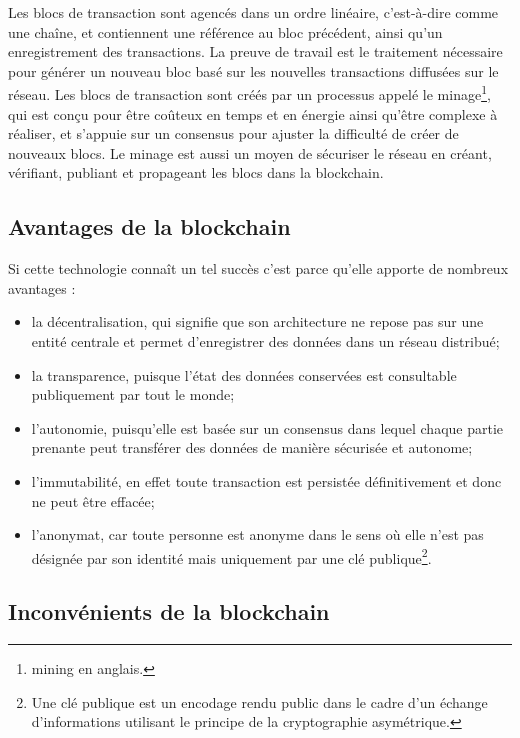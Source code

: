 \documentclass{tnreport}
\begin{document}
Les blocs de transaction sont agencés dans un ordre linéaire, c'est-à-dire comme une chaîne, et contiennent une référence au bloc précédent, ainsi qu'un enregistrement des transactions.
La preuve de travail est le traitement nécessaire pour générer un nouveau bloc basé sur les nouvelles transactions diffusées sur le réseau.
Les blocs de transaction sont créés par un processus appelé le minage\footnote{mining en anglais.}, qui est conçu pour être coûteux en temps et en énergie ainsi qu'être complexe à réaliser, et s'appuie sur un consensus pour ajuster la difficulté de créer de nouveaux blocs. Le minage est aussi un moyen de sécuriser le réseau en créant, vérifiant, publiant et propageant les blocs dans la blockchain.

\subsection{Avantages de la blockchain}

Si cette technologie connaît un tel succès c'est parce qu'elle apporte de nombreux avantages : 
\begin{itemize}
	\item la décentralisation, qui signifie que son architecture ne repose pas sur une entité centrale et permet d'enregistrer des données dans un réseau distribué; 
	\item la transparence, puisque l'état des données conservées est consultable publiquement par tout le monde; 
	\item l'autonomie, puisqu'elle est basée sur un consensus dans lequel chaque partie prenante peut transférer des données de manière sécurisée et autonome;
	\item l'immutabilité, en effet toute transaction est persistée définitivement et donc ne peut être effacée;
	\item l'anonymat, car toute personne est anonyme dans le sens où elle n'est pas désignée par son identité mais uniquement par une clé publique\footnote{Une clé publique est un encodage rendu public dans le cadre d'un échange d'informations utilisant le principe de la cryptographie asymétrique.}.
\end{itemize}

\subsection{Inconvénients de la blockchain}
\label{sec:drawbacks-blockchain}
\end{document}
